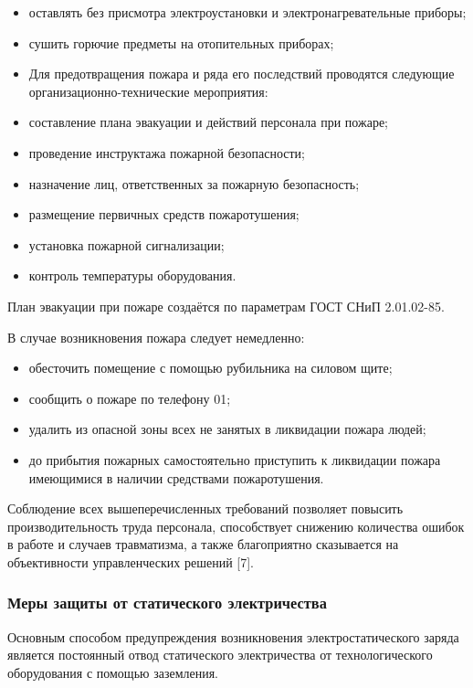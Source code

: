 \begin{itemize}
 \item оставлять без присмотра электроустановки и электронагревательные приборы;
 \item сушить горючие предметы на отопительных приборах;
 \item Для предотвращения пожара и ряда его последствий проводятся следующие организационно-технические мероприятия:
 \item составление плана эвакуации и действий персонала при пожаре;
 \item проведение инструктажа пожарной безопасности;
 \item назначение лиц, ответственных за пожарную безопасность;
 \item размещение первичных средств пожаротушения;
 \item установка пожарной сигнализации;
 \item контроль температуры оборудования.
\end{itemize}

План эвакуации при пожаре создаётся по параметрам ГОСТ СНиП 2.01.02-85.

В случае возникновения пожара следует немедленно:

\begin{itemize}
 \item обесточить помещение с помощью рубильника на силовом щите;
 \item сообщить о пожаре по телефону 01;
 \item удалить из опасной зоны всех не занятых в ликвидации пожара людей;
 \item до прибытия пожарных самостоятельно приступить к ликвидации пожара имеющимися в наличии средствами пожаротушения.
\end{itemize}

Соблюдение всех вышеперечисленных требований позволяет повысить производительность труда персонала, способствует снижению количества ошибок в работе и случаев травматизма, а также благоприятно сказывается на объективности управленческих решений [7].

\subsubsection{Меры защиты от статического электричества}

Основным способом предупреждения возникновения электростатического заряда является постоянный отвод статического электричества от технологического оборудования с помощью заземления. 

